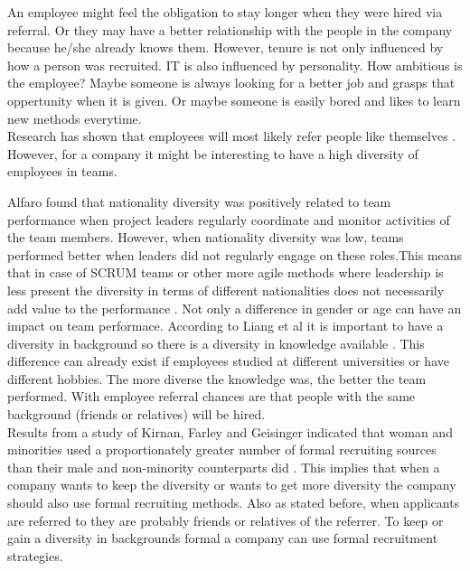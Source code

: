 \documentclass[Main.tex]{subfiles}
\begin{document}
An employee might feel the obligation to stay longer when they were hired via referral. Or they may have a better relationship with the people in the company because he/she already knows them. However, tenure is not only influenced by how a person was recruited. IT is also influenced by personality. How ambitious is the employee? Maybe someone is always looking for a better job and grasps that oppertunity when it is given. Or maybe someone is easily bored and likes to learn new methods everytime.\\

Research has shown that employees will most likely refer people like themselves \cite{sixth}. However, for a company it might be interesting to have a high diversity of employees in teams. 

Alfaro found that nationality diversity was positively related to team performance when project leaders regularly coordinate and monitor activities of the team members. However, when nationality diversity was low, teams performed better when leaders did 
not regularly engage on these roles.This means that in case of SCRUM teams or other more agile methods where leadership is less present the diversity in terms of different nationalities does not necessarily add value to the performance \cite{diversity}.
Not only a difference in gender or age can have an impact on team performace. According to Liang et al it is important to have a diversity in background so there is a diversity in knowledge available \cite{teamdiversity}. This difference can already exist if employees studied at different universities or have different hobbies. The more diverse the knowledge was, the better the team performed. With employee referral chances are that people with the same background (friends or relatives) will be hired. \\

Results from a study of Kirnan, Farley and Geisinger indicated that woman
 and minorities used a proportionately greater number of formal recruiting sources than their male and non-minority counterparts did \cite{tenth}. This implies that when a company wants to keep the diversity or wants to get more diversity the company should also use formal recruiting methods. Also as stated before, when applicants are referred to they are probably friends or relatives of the referrer. To keep or gain a diversity in backgrounds formal a company can use formal recruitment strategies.
\end{document}
